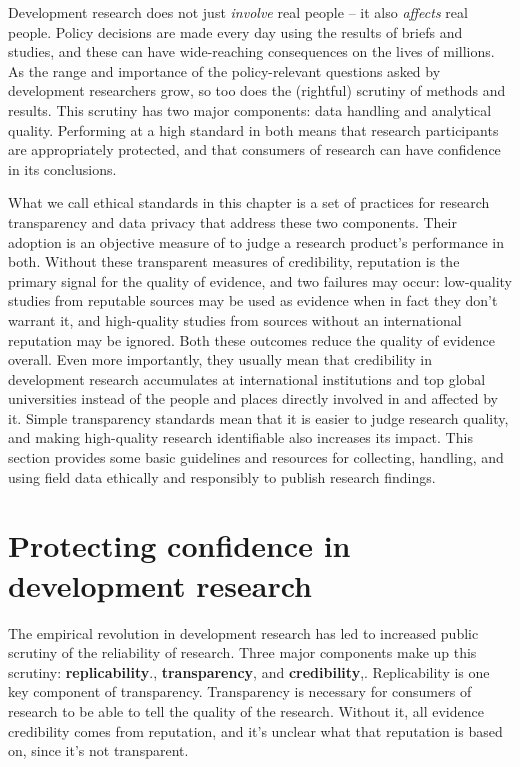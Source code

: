 
\begin{fullwidth}
Development research does not just \textit{involve} real people -- it also \textit{affects} real people.
Policy decisions are made every day using the results of briefs and studies,
and these can have wide-reaching consequences on the lives of millions.
As the range and importance of the policy-relevant questions
asked by development researchers grow,
so too does the (rightful) scrutiny of methods and results.
This scrutiny has two major components: data handling and analytical quality.
Performing at a high standard in both means that research participants
are appropriately protected,
and that consumers of research can have confidence in its conclusions.

What we call ethical standards in this chapter is a set of practices for research transparency and data privacy that address these two components.
Their adoption is an objective measure of to judge a research product's performance in both.
Without these transparent measures of credibility, reputation is the primary signal for the quality of evidence, and two failures may occur:
low-quality studies from reputable sources may be used as evidence when in fact they don't warrant it,
and high-quality studies from sources without an international reputation may be ignored.
Both these outcomes reduce the quality of evidence overall.
Even more importantly, they usually mean that credibility in development research accumulates at international institutions and top global universities instead of the people and places directly involved in and affected by it.
Simple transparency standards mean that it is easier to judge research quality, and making high-quality research identifiable also increases its impact.
This section provides some basic guidelines and resources for collecting, handling, and using field data ethically and responsibly to publish research findings.
\end{fullwidth}


\section{Protecting confidence in development research}

The empirical revolution in development research
has led to increased public scrutiny of the reliability of research.\cite{rogers_2017}
Three major components make up this scrutiny: \textbf{replicability}.\cite{duvendack2017meant}, \textbf{transparency},\cite{christensen2018transparency} and \textbf{credibility},\cite{ioannidis2017power}.
Replicability is one key component of transparency.
Transparency is necessary for consumers of research
to be able to tell the quality of the research.
Without it, all evidence credibility comes from reputation,
and it's unclear what that reputation is based on, since it's not transparent.

